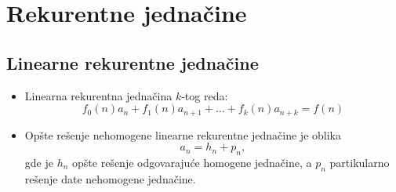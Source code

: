 \documentclass[a4paper,12pt,twoside]{report}
\numberwithin{algorithm}{section}
\begin{document}
\section{Rekurentne jednačine}
\subsection{Linearne rekurentne jednačine}

\begin{itemize}
    \item Linearna rekurentna jednačina $k$-tog reda:
    \[
        f_0(n)a_n + f_1(n)a_{n+1} + \dots + f_k(n)a_{n + k} = f(n)
    \]
    \item Opšte rešenje nehomogene linearne rekurentne jednačine je oblika 
    \[
        a_n = h_n + p_n,
    \]
    gde je $h_n$ opšte rešenje odgovarajuće homogene jednačine, a $p_n$ partikularno rešenje date nehomogene jednačine.
\end{itemize}
\end{document}
